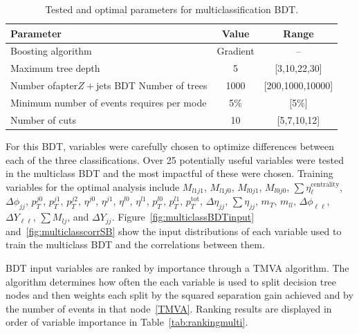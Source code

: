 \begin{table}[h!]
\centering
\begin{tabular}{|l|c|c|}
\hline
Parameter                                    & Value    & Range     \\
\hline
Boosting algorithm                           & Gradient & --        \\
Maximum tree depth                           &  5       & [3,10,22,30]    \\
Number ofapter{$Z+$jets BDT}
Number of trees                              &  1000    & [200,1000,10000] \\
Minimum number of events requires per mode   &  5\%     & [5\%]\\
Number of cuts                               &  10       & [5,7,10,12]  \\
\hline
\end{tabular}
\caption{Tested and optimal parameters for multiclassification BDT.}
\label{tab:multiBDTparameters}
\end{table}

For this BDT, variables were carefully chosen to optimize differences between each of the three classifications. Over 25 potentially useful variables were tested in the multiclass BDT and the most impactful of these were chosen. Training variables for the optimal analysis include $M_{l1j1}$, $M_{l1j0}$, $M_{l0j1}$, $M_{l0j0}$, $\sum \eta_\ell^{\mathrm{centrality}}$, $\Delta \phi_{jj}$, $p_T^{j0}$, $p_T^{j1}$, $p_T^{j2}$, $\eta^{j0}$, $\eta^{j1}$, $\eta^{l0}$, $\eta^{l1}$, $p_T^{l0}$, $p_T^{l1}$, $p_T^{\text{tot}}$, $\Delta \eta_{jj}$, $\sum \eta_{jj}$, $m_T$, $m_{ll}$, $\Delta \phi_{\ell\ell}$, $\Delta Y_{\ell\ell}$, $\sum M_{lj}$, and $\Delta Y_{jj}$. Figure~\ref{fig:multiclassBDTinput} and~\ref{fig:multiclasscorrSB} show the input distributions of each variable used to train the multiclass BDT and the correlations between them.

BDT input variables are ranked by importance through a TMVA algorithm. The algorithm determines how often the each variable is used to split decision tree nodes and then weights each split by the squared separation gain achieved and by the number of events in that node~\ref{TMVA}. Ranking results are displayed in order of variable importance in Table~\ref{tab:rankingmulti}.


